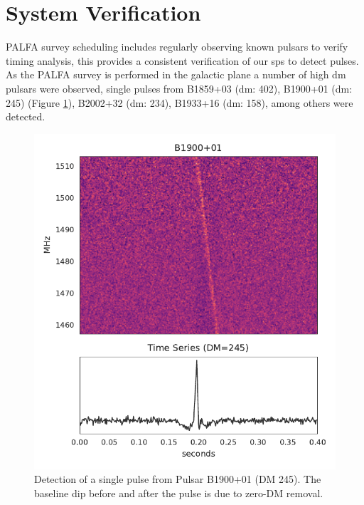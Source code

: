 \documentclass[a4paper,fleqn,usenatbib]{mnras}
\begin{document}


\section{System Verification}
\label{sec:system_verify}

PALFA survey scheduling includes regularly observing known pulsars to verify
timing analysis, this provides a consistent verification of our \gls*{sps} to
detect pulses. As the PALFA survey is performed in the galactic plane a number
of high \gls*{dm} pulsars were observed, single pulses from B1859+03 (\gls*{dm}:
402), B1900+01 (\gls*{dm}: 245) (Figure \ref{fig:B1900}), B2002+32 (\gls*{dm}:
234), B1933+16 (\gls*{dm}: 158), among others were detected.

\begin{figure}
    \includegraphics[width=1.0\linewidth]{figures/B1900_01.pdf}
    \caption{Detection of a single pulse from Pulsar B1900+01 (DM 245). The
    baseline dip before and after the pulse is due to zero-DM removal.
    }
    \label{fig:B1900}
\end{figure}
\end{document}
